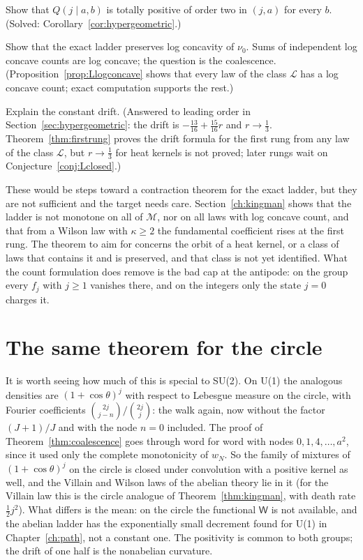 \begin{problem}\label{op:Qtp2}
Show that $Q(j\mid a,b)$ is totally positive of order two in $(j,a)$ for every $b$. (Solved: Corollary~\ref{cor:hypergeometric}.)
\end{problem}

\begin{problem}\label{op:logconcave}
Show that the exact ladder preserves log concavity of $\nu_0$. Sums of independent log concave counts are log concave; the question is the coalescence. (Proposition~\ref{prop:Llogconcave} shows that every law of the class $\mathcal L$ has a log concave count; exact computation supports the rest.)
\end{problem}

\begin{problem}\label{op:drift}
Explain the constant drift. (Answered to leading order in Section~\ref{sec:hypergeometric}: the drift is $-\frac{13}{16}+\frac{15}{16}r$ and $r\to\frac13$. Theorem~\ref{thm:firstrung} proves the drift formula for the first rung from any law of the class $\mathcal L$, but $r\to\frac13$ for heat kernels is not proved; later rungs wait on Conjecture~\ref{conj:Lclosed}.)
\end{problem}

These would be steps toward a contraction theorem for the exact ladder, but they are not sufficient and the target needs care. Section~\ref{ch:kingman} shows that the ladder is not monotone on all of $\mathcal M$, nor on all laws with log concave count, and that from a Wilson law with $\kappa\ge2$ the fundamental coefficient rises at the first rung. The theorem to aim for concerns the orbit of a heat kernel, or a class of laws that contains it and is preserved, and that class is not yet identified. What the count formulation does remove is the bad cap at the antipode: on the group every $f_j$ with $j\ge1$ vanishes there, and on the integers only the state $j=0$ charges it.

\section{The same theorem for the circle}

It is worth seeing how much of this is special to SU(2). On U(1) the analogous densities are $(1+\cos\theta)^j$ with respect to Lebesgue measure on the circle, with Fourier coefficients $\binom{2j}{j-n}/\binom{2j}{j}$: the walk again, now without the factor $(J+1)/J$ and with the node $n=0$ included. The proof of Theorem~\ref{thm:coalescence} goes through word for word with nodes $0,1,4,\dots,a^2$, since it used only the complete monotonicity of $w_N$. So the family of mixtures of $(1+\cos\theta)^j$ on the circle is closed under convolution with a positive kernel as well, and the Villain and Wilson laws of the abelian theory lie in it (for the Villain law this is the circle analogue of Theorem~\ref{thm:kingman}, with death rate $\frac12j^2$). What differs is the mean: on the circle the functional $\mathsf W$ is not available, and the abelian ladder has the exponentially small decrement found for U(1) in Chapter~\ref{ch:path}, not a constant one. The positivity is common to both groups; the drift of one half is the nonabelian curvature.

